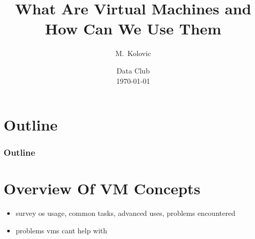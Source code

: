 \documentclass{beamer}
\title[Virtual Machines]
{
    What Are Virtual Machines and How Can We Use Them
}
\author[Kolovic]
{
    M.~Kolovic
}
\institute[UWO]
{
    Robarts Research Institute \\
    University of Western Ontario
}
\date[Summer 2016]
{
    Data Club \\
    \today
}
\begin{document}
\section[Outline]{Outline}

\begin{frame}
    \titlepage
\end{frame}

\begin{frame}
    \frametitle{Outline}
    \tableofcontents[pausesections]
\end{frame}

\section[Introduction]{Overview Of VM Concepts}

\begin{frame}
    \begin{itemize}
        \item survey os usage, common tasks, advanced uses, problems encountered
        \item problems vms cant help with 
    \end{itemize}
\end{frame}
\end{document}
